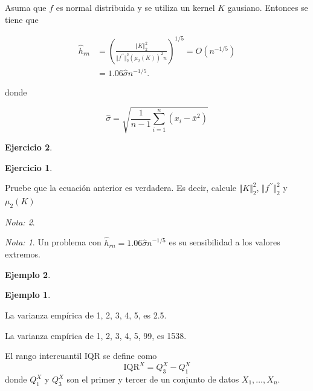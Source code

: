 \documentclass[
  12pt,
]{book}
\theoremstyle{definition}
\theoremstyle{definition}
\newtheorem{example}{Ejemplo}[chapter]
\theoremstyle{definition}
\newtheorem{exercise}{Ejercicio}[chapter]
\theoremstyle{remark}
\newtheorem*{remark}{Nota: }
\begin{document}
Asuma que \(f\) es normal distribuida y se utiliza un kernel \(K\) gausiano. Entonces se tiene que

\begin{align*}
\hat{h}_{rn} & =\left(\frac{\Vert K\Vert_{2}^{2}}{\Vert f^{\prime\prime}\Vert_{2}^{2}\left(\mu_{2}(K)\right)^{2}n}\right)^{1/5}=O\left( n^{-1/5} \right) \\
& =1.06 \hat{\sigma} n^{-1/5}.
\end{align*}

donde

\begin{equation*}
\hat{\sigma} = \sqrt{\frac{1}{n-1} \sum_{i=1}^{n} \left( x_{i}-\bar{x}^{2} \right)}
\end{equation*}

\begin{exercise}
\begin{exercise}
\protect\hypertarget{exr:unlabeled-div-19}{}\label{exr:unlabeled-div-19}

\protect\hypertarget{exr:unnamed-chunk-32}{}{\label{exr:unnamed-chunk-32} }Pruebe que la ecuación anterior es verdadera. Es decir, calcule \(\Vert K\Vert_{2}^{2}\), \(\Vert f^{\prime\prime}\Vert_{2}^{2}\) y \(\mu_{2}(K)\)

\end{exercise}
\end{exercise}

\begin{remark}
\begin{remark}

{}Un problema con \(\hat{h}_{rn}=1.06 \hat{\sigma} n^{-1/5}\) es su sensibilidad a los valores extremos.

\end{remark}
\end{remark}

\begin{example}
\begin{example}
\protect\hypertarget{exm:unlabeled-div-21}{}\label{exm:unlabeled-div-21}

\protect\hypertarget{exm:unnamed-chunk-34}{}{\label{exm:unnamed-chunk-34} }La varianza empírica de 1, 2, 3, 4, 5, es 2.5.

La varianza empírica de 1, 2, 3, 4, 5, 99, es 1538.

\end{example}
\end{example}

El rango intercuantil IQR se define como
\begin{equation*}
\mathrm{IQR}^{X} = Q^{X}_{3} - Q^{X}_{1}
\end{equation*}
donde \(Q^{X}_{1}\) y \(Q^{X}_{3}\) son el primer y tercer de un conjunto de datos \(X_{1},\ldots, X_n\).
\end{document}
